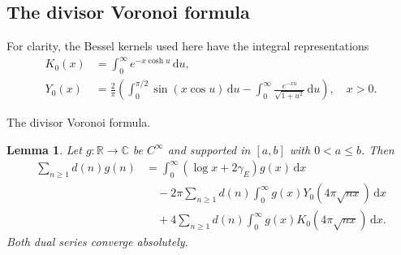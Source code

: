 \documentclass[11pt,a4paper]{article}
\numberwithin{equation}{section}
\newtheorem{lemma}[theorem]{Lemma}
\theoremstyle{definition}
\newcommand{\R}{\mathbb R}
\newcommand{\C}{\mathbb C}
\newcommand{\dd}{\,\mathrm d}
\begin{document}
\subsection{The divisor Voronoi formula}
For clarity, the Bessel kernels used here have the integral representations
\begin{align*}
 K_0(x)&=\int_0^\infty e^{-x\cosh u}\dd u,\\
 Y_0(x)&=\frac2\pi\left(\int_0^{\pi/2}\sin(x\cos u)\dd u
                -\int_0^\infty\frac{e^{-xu}}{\sqrt{1+u^2}}\dd u\right),\quad x>0.
\end{align*}
\par\medskip\noindent The divisor Voronoi formula.
\begin{lemma}\label{lem:voronoi}
Let $g:\R\to\C$ be $C^\infty$ and supported in $[a,b]$ with $0<a\le b$.
Then
\begin{align}\label{eq:voronoi}
 \sum_{n\ge1}d(n)g(n)
 &=\int_0^\infty(\log x+2\gamma_E)g(x)\dd x\\
 &\quad-2\pi\sum_{n\ge1}d(n)\int_0^\infty
                          g(x)Y_0(4\pi\sqrt{nx})\dd x\nonumber\\
 &\quad+4\sum_{n\ge1}d(n)\int_0^\infty
                          g(x)K_0(4\pi\sqrt{nx})\dd x.\nonumber
\end{align}
Both dual series converge absolutely.
\end{lemma}
\end{document}
